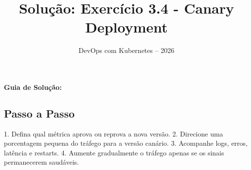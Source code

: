 \documentclass[11pt,a4paper]{article}
\title{\color{secondary}\Huge\textbf{Solução: Exercício 3.4 - Canary Deployment}}
\author{\color{primary}DevOps com Kubernetes -- 2026}
\date{}
\begin{document}
\maketitle


\textbf{Guia de Solução:}

\subsection*{\color{secondary}Passo a Passo}

1. Defina qual métrica aprova ou reprova a nova versão.
2. Direcione uma porcentagem pequena do tráfego para a versão canário.
3. Acompanhe logs, erros, latência e restarts.
4. Aumente gradualmente o tráfego apenas se os sinais permanecerem saudáveis.
\end{document}
